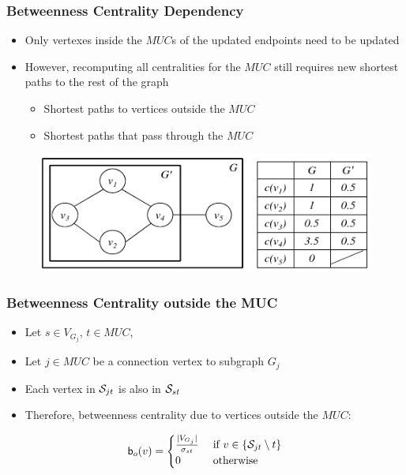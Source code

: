 \begin{frame}
  \frametitle{Betweenness Centrality Dependency}

  \begin{itemize}
    \item Only vertexes inside the $MUC$s of the updated endpoints need to be updated
    \item However, recomputing all centralities for the $MUC$ still requires new shortest paths to the rest of the graph
      \begin{itemize}
        \item Shortest paths to vertices outside the $MUC$
        \item Shortest paths that pass through the $MUC$
      \end{itemize}
  \end{itemize}

  \begin{figure}[t]
    \centering
    \includegraphics[width=\textwidth, height=0.6\textheight, keepaspectratio]{imgs/qube-btwmuc}
  \end{figure}
\end{frame}


\begin{frame}
  \frametitle{Betweenness Centrality outside the MUC}

  \begin{itemize}
    \item Let $s \in V_{G_j}$, $t \in MUC$,
    \item Let $j \in MUC$ be a connection vertex to subgraph $G_j$
    \item Each vertex in $\mathcal{S}_{jt}$ is also in $\mathcal{S}_{st}$
    \item Therefore, betweenness centrality due to vertices outside the $MUC$:
  \end{itemize}

  \begin{align*}
    \mathsf{b}_{o}(v) = \begin{cases}
      \frac{|V_{G_j}|}{\sigma_{st}}		& \text{ if } v \in\{ \mathcal{S}_{jt} \setminus t \} \\
      0 						& \text{ otherwise }
    \end{cases}
  \end{align*}
\end{frame}


